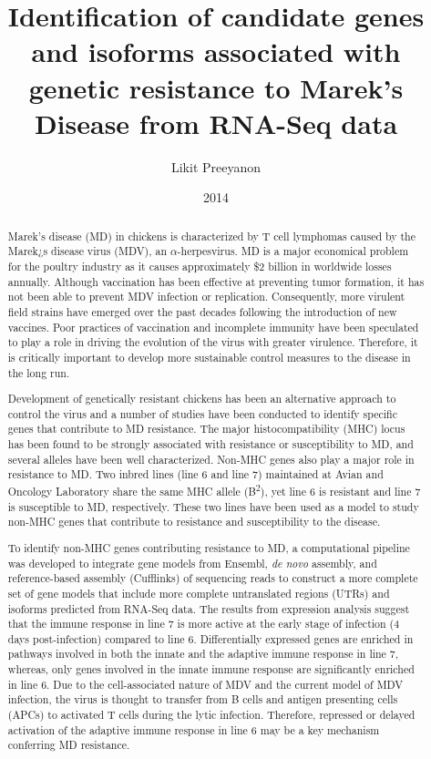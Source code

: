 \documentclass[lscape]{msu-thesis}
\title{Identification of candidate genes and isoforms associated with
genetic resistance to Marek's Disease from RNA-Seq data}
\author{Likit Preeyanon}
\date{2014}
\begin{document}
\frontmatter
\maketitlepage
\begin{abstract}

Marek's disease (MD) in chickens is characterized by T cell
lymphomas caused by the Marek¿s disease virus (MDV), an
$\alpha$-herpesvirus. MD is a major economical problem for
the poultry industry as it causes approximately \$2 billion
in worldwide losses annually. Although vaccination has been
effective at preventing tumor formation, it has not been
able to prevent MDV infection or replication.  Consequently,
more virulent field strains have emerged over the past
decades following the introduction of new vaccines. Poor
practices of vaccination and incomplete immunity have been
speculated to play a role in driving the evolution of the
virus with greater virulence. Therefore, it is critically
important to develop more sustainable control measures to
the disease in the long run.

Development of genetically resistant chickens has been an
alternative approach to control the virus and a number of studies
have been conducted to identify specific genes that contribute to
MD resistance. The major histocompatibility (MHC) locus has been
found to be strongly associated with resistance or susceptibility
to MD, and several alleles have been well characterized.  Non-MHC
genes also play a major role in resistance to MD. Two inbred
lines (line 6 and line 7) maintained at Avian and Oncology
Laboratory share the same MHC allele (B\textsuperscript{2}), yet
line 6 is resistant and line 7 is susceptible to MD,
respectively.  These two lines have been used as a model to study
non-MHC genes that contribute to resistance and susceptibility to
the disease.

To identify non-MHC genes contributing resistance to MD, a
computational pipeline was developed to integrate gene models
from Ensembl, {\em de novo} assembly, and reference-based
assembly (Cufflinks) of sequencing reads to construct a more
complete set of gene models that include more complete
untranslated regions (UTRs) and isoforms predicted from RNA-Seq
data. The results from expression analysis suggest that the
immune response in line 7 is more active at the early stage of
infection (4 days post-infection) compared to line 6.
Differentially expressed genes are enriched in pathways involved
in both the innate and the adaptive immune response in line 7,
whereas, only genes involved in the innate immune response are
significantly enriched in line 6. Due to the cell-associated
nature of MDV and the current model of MDV infection, the virus
is thought to transfer from B cells and antigen presenting cells
(APCs) to activated T cells during the lytic infection.
Therefore, repressed or delayed activation of the adaptive immune
response in line 6 may be a key mechanism conferring MD
resistance.


\end{abstract}
\end{document}

